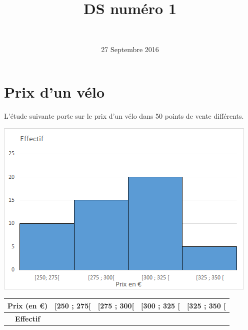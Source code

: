 \documentclass[a4paper,11pt]{exam}
\author{\ }
\date{27 Septembre 2016}
\title{DS num\'ero 1}
\begin{document}
	
	\maketitle
\section{Prix d'un vélo}
	
	
	L'étude suivante porte sur le prix d'un vélo dans 50 points de vente différents.
	
	\begin{center}
		\includegraphics[scale=0.55]{./histo}
	\end{center}
		
		
				
		\begin{table}[h]
			\centering
			\label{my-label}
			\begin{tabular}{|@{\ }c@{\ }|@{\ }c@{\ }|@{\ }c@{\ }|@{\ }c@{\ }|@{\ }c@{\ }|}
				\hline
				\textbf{Prix} (en €) & [250 ; 275[ & [275 ; 300[ & [300 ; 325 [  & [325 ; 350 [\\
				\hline
				\textbf{Effectif} &  &  &  & \\
				\hline 
			\end{tabular}
		\end{table}
	
	
		
		
\end{document}
